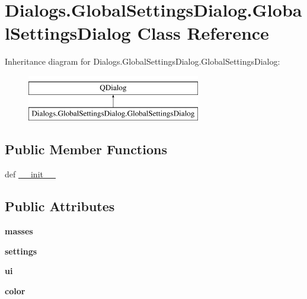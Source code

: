 \hypertarget{classDialogs_1_1GlobalSettingsDialog_1_1GlobalSettingsDialog}{\section{Dialogs.\-Global\-Settings\-Dialog.\-Global\-Settings\-Dialog Class Reference}
\label{classDialogs_1_1GlobalSettingsDialog_1_1GlobalSettingsDialog}
}
Inheritance diagram for Dialogs.\-Global\-Settings\-Dialog.\-Global\-Settings\-Dialog\-:\begin{figure}[H]
\begin{center}
\leavevmode
\includegraphics[height=2.000000cm]{classDialogs_1_1GlobalSettingsDialog_1_1GlobalSettingsDialog}
\end{center}
\end{figure}
\subsection*{Public Member Functions}
\begin{DoxyCompactItemize}
\item 
def \hyperlink{classDialogs_1_1GlobalSettingsDialog_1_1GlobalSettingsDialog_a9522566c5d137175f043877d821fdb19}{\-\_\-\-\_\-init\-\_\-\-\_\-}
\end{DoxyCompactItemize}
\subsection*{Public Attributes}
\begin{DoxyCompactItemize}
\item 
\hypertarget{classDialogs_1_1GlobalSettingsDialog_1_1GlobalSettingsDialog_a4b45d9d073d105d1430ca47021365110}{{\bfseries masses}}\label{classDialogs_1_1GlobalSettingsDialog_1_1GlobalSettingsDialog_a4b45d9d073d105d1430ca47021365110}

\item 
\hypertarget{classDialogs_1_1GlobalSettingsDialog_1_1GlobalSettingsDialog_af95fecda58868341ee82aa28b099ee82}{{\bfseries settings}}\label{classDialogs_1_1GlobalSettingsDialog_1_1GlobalSettingsDialog_af95fecda58868341ee82aa28b099ee82}

\item 
\hypertarget{classDialogs_1_1GlobalSettingsDialog_1_1GlobalSettingsDialog_a28f27e885f9ea23e376192fb2ba9ea9e}{{\bfseries ui}}\label{classDialogs_1_1GlobalSettingsDialog_1_1GlobalSettingsDialog_a28f27e885f9ea23e376192fb2ba9ea9e}

\item 
\hypertarget{classDialogs_1_1GlobalSettingsDialog_1_1GlobalSettingsDialog_a7cbf5444a8338bcfcf2fd42bf400085e}{{\bfseries color}}\label{classDialogs_1_1GlobalSettingsDialog_1_1GlobalSettingsDialog_a7cbf5444a8338bcfcf2fd42bf400085e}

\end{DoxyCompactItemize}


